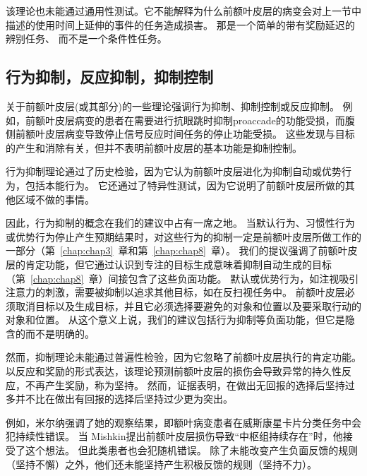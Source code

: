 该理论也未能通过通用性测试。它不能解释为什么前额叶皮层的病变会对上一节中描述的使用时间上延伸的事件的任务造成损害。
那是一个简单的带有奖励延迟的辨别任务、 而不是一个条件性任务\cite{browning2008prefrontal}。



\subsection{行为抑制，反应抑制，抑制控制}

关于前额叶皮层(或其部分)的一些理论强调行为抑制、抑制控制或反应抑制\cite{roberts2000inhibitory,eagle2008neuropsychopharmacology}。
例如，前额叶皮层病变的患者在需要进行抗眼跳时抑制proaccade的功能受损\cite{ploner2005prefrontal}，而腹侧前额叶皮层病变导致停止信号反应时间任务的停止功能受损\cite{aron2003stop}。
这些发现与目标的产生和消除有关，但并不表明前额叶皮层的基本功能是抑制控制。
\par


行为抑制理论通过了历史检验，因为它认为前额叶皮层进化为抑制自动或优势行为，包括本能行为。
它还通过了特异性测试，因为它说明了前额叶皮层所做的其他区域不做的事情。
\par


因此，行为抑制的概念在我们的建议中占有一席之地。 
当默认行为、习惯性行为或优势行为停止产生预期结果时，对这些行为的抑制一定是前额叶皮层所做工作的一部分（第~\ref{chap:chap3}~章和第~\ref{chap:chap8}~章）。
我们的提议强调了前额叶皮层的肯定功能，但它通过认识到专注的目标生成意味着抑制自动生成的目标（第~\ref{chap:chap8}~章）间接包含了这些负面功能。 
默认或优势行为，如注视吸引注意力的刺激，需要被抑制以追求其他目标，如在反扫视任务中。
前额叶皮层必须取消目标以及生成目标，并且它必须选择要避免的对象和位置以及要采取行动的对象和位置。
从这个意义上说，我们的建议包括行为抑制等负面功能，但它是隐含的而不是明确的。
\par


然而，抑制理论未能通过普遍性检验，因为它忽略了前额叶皮层执行的肯定功能。
以反应和奖励的形式表达，该理论预测前额叶皮层的损伤会导致异常的持久性反应，不再产生奖励，称为坚持。 
然而，证据表明，在做出无回报的选择后坚持过多并不比在做出有回报的选择后坚持过少更为突出。
\par


例如，米尔纳\cite{milner1963effects}强调了她的观察结果，即额叶病变患者在威斯康星卡片分类任务中会犯持续性错误。
当 Mishkin\cite{mishkin1964perseveration}提出前额叶皮层损伤导致“中枢组持续存在”时，他接受了这个想法。
但此类患者也会犯随机错误\cite{barcelo2002both}。
除了未能改变产生负面反馈的规则（坚持不懈）之外，他们还未能坚持产生积极反馈的规则（坚持不力）。
\par


